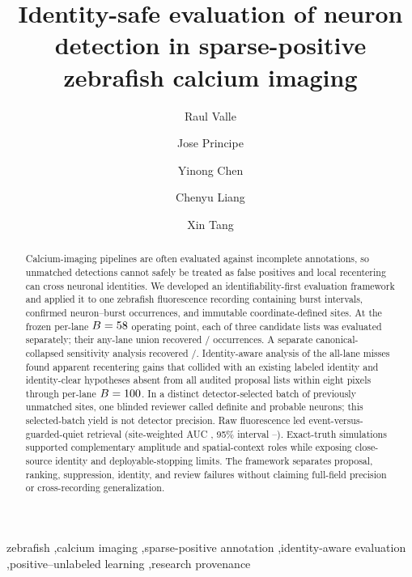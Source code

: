 \documentclass[preprint,12pt,authoryear]{elsarticle}
\begin{document}
\begin{frontmatter}

\title{Identity-safe evaluation of neuron detection in sparse-positive zebrafish calcium imaging}

\author[uf]{Raul Valle}
\author[affpending]{Jose Principe}
\author[affpending]{Yinong Chen}
\author[affpending]{Chenyu Liang}
\author[affpending]{Xin Tang}

\address[uf]{Department of Electrical and Computer Engineering, University of Florida, Gainesville, Florida, United States}
\address[affpending]{Affiliations to be confirmed for Jose Principe, Yinong Chen, Chenyu Liang, and Xin Tang}

\begin{abstract}
Calcium-imaging pipelines are often evaluated against incomplete annotations,
so unmatched detections cannot safely be treated as false positives and local
recentering can cross neuronal identities. We developed an identifiability-first
evaluation framework and applied it to one zebrafish fluorescence recording
containing \VenueCohortBursts{} burst intervals,
\VenueCohortOccurrences{} confirmed neuron--burst occurrences, and
\VenueCohortSites{} immutable coordinate-defined sites. At the frozen per-lane
\(B=58\) operating point, each of three candidate lists was
evaluated separately; their any-lane union recovered
\VenueStrictRecovered/\VenueCohortOccurrences{} occurrences. A separate
canonical-collapsed sensitivity analysis recovered
\VenueCanonicalRecovered/\VenueCanonicalOccurrences. Identity-aware analysis
of the \VenueStrictMissed{} all-lane misses found
\VenueIdentityCollision{} apparent recentering gains that collided with an
existing labeled identity and \VenueIdentityClear{} identity-clear hypotheses
absent from all audited proposal lists within eight pixels through per-lane
\(B=100\). In a distinct detector-selected batch of
\VenueReviewedCandidates{} previously unmatched sites, one blinded reviewer
called \VenueReviewDefinite{} definite and \VenueReviewProbable{} probable
neurons; this selected-batch yield is not detector precision. Raw fluorescence
led event-versus-guarded-quiet retrieval (site-weighted AUC \VenueRawAUC,
95\% interval \VenueRawAUCLow--\VenueRawAUCHigh). Exact-truth simulations
supported complementary amplitude and spatial-context roles while exposing
close-source identity and deployable-stopping limits. The framework separates
proposal, ranking, suppression, identity, and review failures without claiming
full-field precision or cross-recording generalization.
\end{abstract}

\begin{keyword}
zebrafish \sep calcium imaging \sep sparse-positive annotation \sep identity-aware evaluation \sep positive--unlabeled learning \sep research provenance
\end{keyword}

\end{frontmatter}
\end{document}
